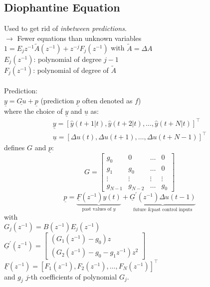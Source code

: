 \documentclass[english]{latex4ei/latex4ei_sheet}
\begin{document}
\begin{sectionbox}
\subsection{Diophantine Equation}
Used to get rid of \textit{inbetween predictions}.\\
$\rightarrow$ Fewer equations than unknown variables\\
$1=E_{j} z^{-1} \tilde{A}\left(z^{-1}\right)+z^{-j} F_{j}\left(z^{-1}\right)$ with $\tilde{A}=\Delta A$ \\ $E_{j}\left(z^{-1}\right)$: polynomial of degree $j-1$ \\ $F_{j}\left(z^{-1}\right)$: polynomial of degree of $\tilde{A}$
\\ \\
Prediction:\\ $\underline{y}=\underline{G u}+\underline{p}$ \quad(prediction $\underline{p}$ often denoted as $f$)\\
where the choice of $\underline{y}$ and $\underline{u}$ as:
$$
\begin{array}{l}{\underline{y}=[\hat{y}(t+1 | t), \hat{y}(t+2 | t), \ldots, \hat{y}(t+N | t)]^{\top}} \\ 
\underline{u}=[\Delta u(t), \Delta u(t+1), \ldots, \Delta u(t+N-1)]^{\top}
\end{array}
$$
defines $G$ and $\underline{p}$:
$$G=\left[\begin{array}{cccc}{g_{0}} & {0} & {\dots} & {0} \\ {g_{1}} & {g_{0}} & {\dots} & {0} \\ {\vdots} & {\vdots} & {\vdots} & {\vdots} \\ {g_{N-1}} & {g_{N-2}} & {\dots} & {g_{0}}\end{array}\right]$$
$$\underline{p}=\underbrace{\underline{F}\left(z^{-1}\right) y(t)}_{\text{past values of } y}+\underbrace{\underline{G}^{\prime}\left(z^{-1}\right) \Delta u(t-1)}_{\text{future \& past control inputs}}$$
with\\
$G_{j}\left(z^{-1}\right)=B\left(z^{-1}\right) E_{j}\left(z^{-1}\right)$\\
$\underline{G}^{\prime}\left(z^{-1}\right)=\left[\begin{array}{c}{\left(G_{1}\left(z^{-1}\right)-g_{0}\right) z} \\ {\left(G_{2}\left(z^{-1}\right)-g_{0}-g_{1} z^{-1}\right) z^{2}}\end{array}\right]$\\
$\underline{F}\left(z^{-1}\right)=\left[F_{1}\left(z^{-1}\right), F_{2}\left(z^{-1}\right), \ldots, F_{N}\left(z^{-1}\right)\right]^{\top}$\\
and $g_{j}$ $j$-th coefficients of polynomial $G_{j}$.

\end{sectionbox}
\end{document}
